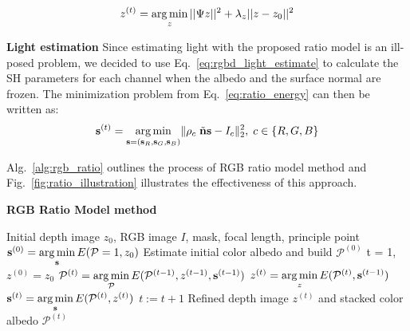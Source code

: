 \begin{equation}\label{eq:ratio_depth_refine}
    z^{(t)}= \operatorname*{arg\,min}_{z}  ||\Psi z||^2 + \lambda_z||z - z_0||^2
\end{equation}

\textbf{Light estimation}
Since estimating light with the proposed ratio model is an ill-posed problem, we decided to use Eq.~\ref{eq:rgbd_light_estimate} to calculate the SH parameters for each channel when the albedo and the surface normal are frozen. The minimization problem from Eq.~\ref{eq:ratio_energy} can then be written as:
\begin{equation}\label{eq:ratio_light_estimate}
    \mathbf{s}^{(t)} = \operatorname*{arg\,min}_{\mathbf{s} = (\mathbf{s}_R, \mathbf{s}_G, \mathbf{s}_B)}\lVert \rho_c \; \tilde{\mathbf{n}}\mathbf{s} - I_c\rVert^2_2, \; c\in\{R,G,B\}
\end{equation}

Alg.~\ref{alg:rgb_ratio} outlines the process of RGB ratio model method and Fig.~\ref{fig:ratio_illustration} illustrates the effectiveness of this approach.

\begin{algorithm}[!htbp]
    \begin{algorithmic}[1]
          \caption{\textbf{RGB Ratio Model method}}
        \label{alg:rgb_ratio}
         \renewcommand{\algorithmicrequire}{\textbf{Input:}}
         \renewcommand{\algorithmicensure}{\textbf{Output:}}
         \REQUIRE Initial depth image $z_0$, RGB image $I$, mask, focal length, principle point
         \vspace{1.8mm}
         \STATE $\mathbf{s}^{(0)} = \operatorname*{arg\,min} \limits_{\mathbf{s}} E(\mathcal{P} =1, z_0)$ 
         \STATE Estimate initial color albedo and build $\mathcal{P}^{(0)}$  
         \STATE t = 1, $z^{(0)} = z_0$
         \vspace{1.8mm}
           \vspace{1.8mm}
            \STATE $\mathcal{P}^{(t)} = \operatorname*{arg\,min} \limits_{\mathcal{P}} E(\mathcal{P}^{(t-1)}, z^{(t-1)}, \mathbf{s}^{(t-1)})$ 
              \STATE $z^{(t)} = \operatorname*{arg\,min} \limits_{z} E(\mathcal{P}^{(t)}, \mathbf{s}^{(t-1)})$ 
              \STATE $\mathbf{s}^{(t)} = \operatorname*{arg\,min} \limits_{\mathbf{s}} E(\mathcal{P}^{(t)}, z^{(t)})$ 
              \vspace{1.8mm}
                  \STATE $t := t + 1$
         \vspace{1.8mm}
          \ENDWHILE
          \ENSURE  Refined depth image $z^{(t)}$ and stacked color albedo $\mathcal{P}^{(t)}$
    \end{algorithmic}
\end{algorithm}

